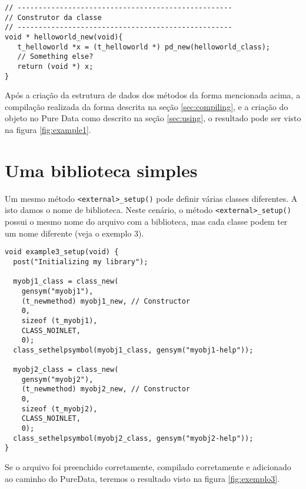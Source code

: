 \vspace{1em}
\begin{lstlisting}[caption=Construtor de uma classe]
// ---------------------------------------------------
// Construtor da classe
// ---------------------------------------------------
void * helloworld_new(void){
   t_helloworld *x = (t_helloworld *) pd_new(helloworld_class);
   // Something else?
   return (void *) x;
}
\end{lstlisting}

Após a criação da estrutura de dados dos métodos da forma mencionada acima, a
compilação realizada da forma descrita na seção \ref{sec:compiling}, e a
criação do objeto no Pure Data como descrito na seção \ref{sec:using}, o
resultado pode ser visto na figura \ref{fig:example1}.


\section{Uma biblioteca simples}

Um mesmo método \texttt{<external>\_setup()} pode definir várias classes
diferentes. A isto damos o nome de biblioteca. Neste cenário, o método
\texttt{<external>\_setup()} possui o mesmo nome do arquivo com a biblioteca,
mas cada classe podem ter um nome diferente (veja o exemplo 3).

\vspace{1em}
\begin{lstlisting}[caption=Exemplo de arquivo com duas classes]
void example3_setup(void) {
  post("Initializing my library");

  myobj1_class = class_new(
    gensym("myobj1"),
    (t_newmethod) myobj1_new, // Constructor
    0,
    sizeof (t_myobj1),
    CLASS_NOINLET,
    0);
  class_sethelpsymbol(myobj1_class, gensym("myobj1-help"));

  myobj2_class = class_new(
    gensym("myobj2"),
    (t_newmethod) myobj2_new, // Constructor
    0,
    sizeof (t_myobj2),
    CLASS_NOINLET,
    0);
  class_sethelpsymbol(myobj2_class, gensym("myobj2-help"));
}
\end{lstlisting}

Se o arquivo foi preenchido corretamente, compilado corretamente e adicionado
ao caminho do PureData, teremos o resultado visto na figura \ref{fig:exemplo3}.

